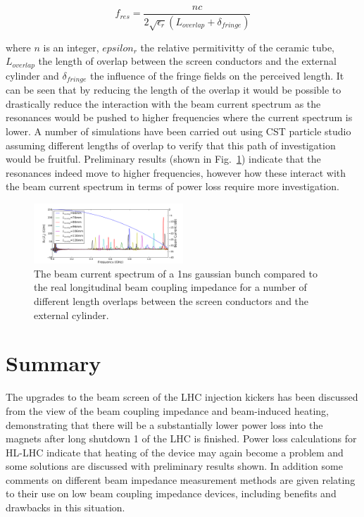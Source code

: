 \documentclass[a4paper,
              ]{jacow}
\begin{document}
\begin{equation}
f_{res} = \frac{n c}{2 \sqrt{\epsilon_{r}}\left( L_{overlap} + \delta_{fringe} \right)}
\end{equation}

where $n$ is an integer, $epsilon_{r}$ the relative permitivitty of the ceramic tube, $L_{overlap}$ the length of overlap between the screen conductors and the external cylinder and $\delta_{fringe}$ the influence of the fringe fields on the perceived length. It can be seen that by reducing the length of the overlap it would be possible to drastically reduce the interaction with the beam current spectrum as the resonances would be pushed to higher frequencies where the current spectrum is lower. A number of simulations have been carried out using CST particle studio \cite{cst-cite} assuming different lengths of overlap to verify that this path of investigation would be fruitful. Preliminary results (shown in Fig.~\ref{fig:overLapSpec}) indicate that the resonances indeed move to higher frequencies, however how these interact with the beam current spectrum in terms of power loss require more investigation.

\begin{figure}
\includegraphics[width=0.5\textwidth]{overlapSpec.pdf}
\caption{The beam current spectrum of a 1ns gaussian bunch compared to the real longitudinal beam coupling impedance for a number of different length overlaps between the screen conductors and the external cylinder.}
\label{fig:overLapSpec}
\end{figure}

\section{Summary}

The upgrades to the beam screen of the LHC injection kickers has been discussed from the view of the beam coupling impedance and beam-induced heating, demonstrating that there will be a substantially lower power loss into the magnets after long shutdown 1 of the LHC is finished. Power loss calculations for HL-LHC indicate that heating of the device may again become a problem and some solutions are discussed with preliminary results shown. In addition some comments on different beam impedance measurement methods are given relating to their use on low beam coupling impedance devices, including benefits and drawbacks in this situation.
\end{document}
